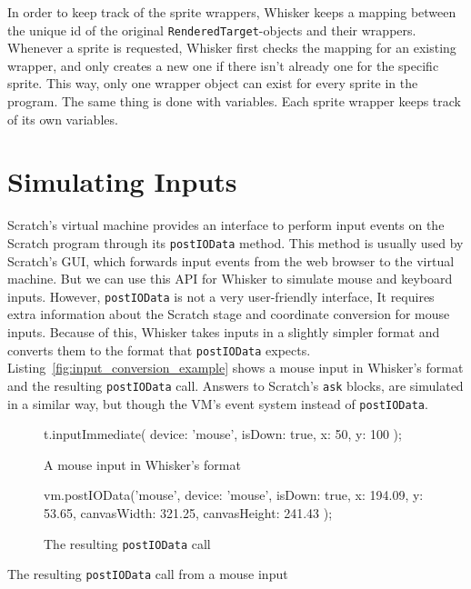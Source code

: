 In order to keep track of the sprite wrappers,
Whisker keeps a mapping between the unique id of the original \texttt{RenderedTarget}-objects and their wrappers.
Whenever a sprite is requested, Whisker first checks the mapping for an existing wrapper,
and only creates a new one if there isn't already one for the specific sprite.
This way, only one wrapper object can exist for every sprite in the program.
The same thing is done with variables.
Each sprite wrapper keeps track of its own variables.

\section{Simulating Inputs}
\label{sec:simulating_inputs}

Scratch's virtual machine provides an interface to perform input events on the Scratch program through its \texttt{postIOData} method.
This method is usually used by Scratch's GUI, which forwards input events from the web browser to the virtual machine.
But we can use this API for Whisker to simulate mouse and keyboard inputs.
However, \texttt{postIOData} is not a very user-friendly interface,
It requires extra information about the Scratch stage and coordinate conversion for mouse inputs.
Because of this, Whisker takes inputs in a slightly simpler format and converts them to the format that \texttt{postIOData} expects.
Listing~\ref{fig:input_conversion_example} shows a mouse input in Whisker's format and the resulting \texttt{postIOData} call.
Answers to Scratch's \texttt{ask} blocks, are simulated in a similar way, but though the VM's event system instead of \texttt{postIOData}.
\parspace

\begin{listing}[htpb]
    \centering

    \begin{subfigure}[b]{.25\textwidth}
        \begin{javascriptcode}
            t.inputImmediate({
                device: 'mouse',
                isDown: true,
                x: 50,
                y: 100
            });
        \end{javascriptcode}
        \vspace{-\bigskipamount}
        \caption{A mouse input in Whisker's format}
    \end{subfigure}
    \hspace{.08\textwidth}
    \begin{subfigure}[b]{.3\textwidth}
        \begin{javascriptcode}
            vm.postIOData('mouse', {
                device: 'mouse',
                isDown: true,
                x: 194.09,
                y: 53.65,
                canvasWidth: 321.25,
                canvasHeight: 241.43
            });
        \end{javascriptcode}
        \vspace{-\bigskipamount}
        \caption{The resulting \texttt{postIOData} call}
    \end{subfigure}

    \caption{The resulting \texttt{postIOData} call from a mouse input}
    \label{fig:input_conversion_example}
\end{listing}

